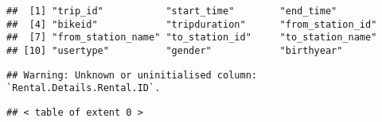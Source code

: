 \documentclass[
]{article}
\newenvironment{Shaded}{\begin{snugshade}}{\end{snugshade}}
\newcommand{\FunctionTok}[1]{\textcolor[rgb]{0.00,0.00,0.00}{#1}}
\newcommand{\NormalTok}[1]{#1}
\newcommand{\SpecialCharTok}[1]{\textcolor[rgb]{0.00,0.00,0.00}{#1}}
\begin{document}
\begin{verbatim}
##  [1] "trip_id"           "start_time"        "end_time"         
##  [4] "bikeid"            "tripduration"      "from_station_id"  
##  [7] "from_station_name" "to_station_id"     "to_station_name"  
## [10] "usertype"          "gender"            "birthyear"
\end{verbatim}

\begin{Shaded}
\end{Shaded}

\begin{verbatim}
## Warning: Unknown or uninitialised column: `Rental.Details.Rental.ID`.
\end{verbatim}

\begin{verbatim}
## < table of extent 0 >
\end{verbatim}
\end{document}
